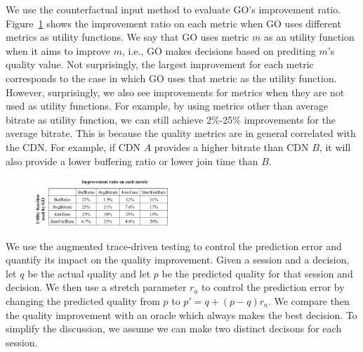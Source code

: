 We use the counterfactual input method to evaluate GO's improvement
ratio. Figure~\ref{fig:cross-metrics} shows the improvement ratio on
each metric when GO uses different metrics as utility functions. We
say that GO uses metric $m$ as an utility function when it aims to
improve $m$, i.e., GO makes decisions based on prediting $m$'s quality
value. Not surprisingly, the largest improvement for each metric
corresponds to the case in which GO uses that metric as the utility
function. However, surprisingly, we also see improvements for metrics
when they are not used as utility functions. For example, by using
metrics other than average bitrate as utility function, we can still
achieve 2\%-25\% improvements for the average bitrate. This is because
the quality metrics are in general correlated with the CDN. For
example, if CDN $A$ provides a higher bitrate than CDN $B$, it will
also provide a lower buffering ratio or lower join time than $B$.


\begin{figure}[h!]
\centering
 \includegraphics[width=0.45\textwidth] {figures/newfig/cross-metric.pdf}
\label{fig:cross-metrics}
\end{figure}



\label{subsec:impact-accuracy}


We use the augmented trace-driven testing to control the prediction
error and quantify its impact on the quality improvement. Given a
session and a decision, let $q$ be the actual quality and let $p$ be
the predicted quality for that session and decision. We then use a
stretch parameter $r_a$ to control the prediction error by changing
the predicted quality from $p$ to $p'=q+(p-q)r_a$.  We compare then
the quality improvement with an oracle which always makes the best
decision. To simplify the discussion, we assume we can make two
distinct decisons for each session.

